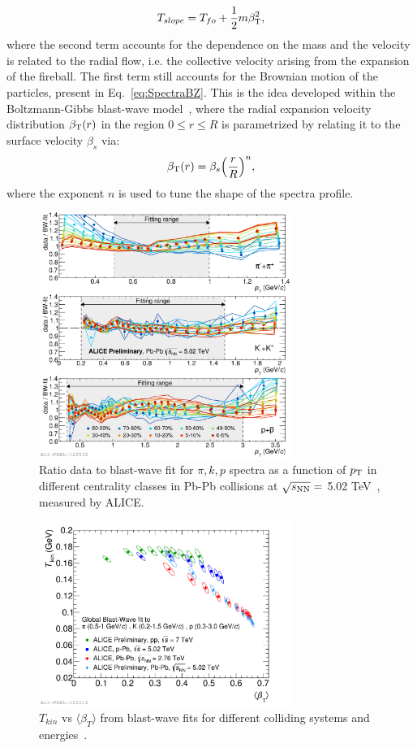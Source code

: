 \begin{equation}
\label{eq:Tslope}
T_{slope} = T_{fo} + \frac{1}{2}m \beta_{\rm T}^{2},
\end{equation}
where the second term accounts for the dependence on the mass 
and the velocity is related to the radial flow, i.e. the collective velocity
 arising from the expansion of the fireball. The first term still accounts
  for the Brownian motion of the particles, present in Eq.~\ref{eq:SpectraBZ}.
   This is the idea developed within the Boltzmann-Gibbs blast-wave 
   model~\cite{Schnedermann:1993ws}, where the radial expansion 
   velocity distribution $\beta_{\rm T}(r)$ in the region \mbox{$0 \leq r \leq R$} 
   is parametrized by relating it to the surface velocity $\beta_s$ via:
\begin{equation}
\label{eq:Br}
\beta_{\rm T} (r) = \beta_s \Big(\frac{r}{R}\Big )^n,
\end{equation}
where the exponent $n$ is used to tune the shape of the spectra profile.
\begin{figure}[!t]
  \centering
   \includegraphics[height=8cm]{FigCap1/BW_5TeV.pdf}
 \caption{Ratio data to blast-wave fit for $\pi, k, p$ spectra as a function of $p_{\rm T}$ in different centrality classes in Pb-Pb collisions at $\sqrt{s_{\rm NN}} = $ 5.02 TeV~\cite{Jacazio:2017dvy}, measured by ALICE.}
  \label{fig:BWfit}
\end{figure}
\begin{figure}[!t]
  \centering
  \includegraphics[height=6cm]{FigCap1/BWfit_BetaTplot.pdf}
 \caption{$T_{kin}$ vs $\langle \beta_T \rangle$ from blast-wave fits for different colliding systems and energies~\cite{Jacazio:2017dvy}.}
  \label{fig:BetaTplot}
\end{figure}

